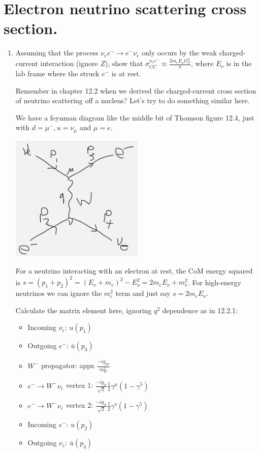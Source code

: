 \section{Electron neutrino scattering cross section.}

\begin{enumerate}[label=\textbf{\alph*}.]
  \item Assuming that the process $\nu_e e^- \to e^- \nu_e$ only occurs by the weak charged-current interaction (ignore $Z$), show that $\sigma_{CC}^{\nu_e e^-} \approx \frac{2m_e E_\nu G_F^2}{\pi}$, where $E_\nu$ is in the lab frame where the struck $e^-$ is at rest.

  Remember in chapter 12.2 when we derived the charged-current cross section of neutrino scattering off a nucleus? Let's try to do something similar here.

  We have a feynman diagram like the middle bit of Thomson figure 12.4, just with $d=\mu^-, u=\nu_\mu$ and $\mu=e$.

  \begin{center}
    \includegraphics[width=0.5\textwidth]{q4_feynman.png}
  \end{center}

  For a neutrino interacting with an electron at rest, the CoM energy squared is $s = (p_1 + p_2)^2 = (E_\nu + m_e)^2 - E_\nu^2 = 2m_e E_\nu + m_e^2$. For high-energy neutrinos we can ignore the $m_e^2$ term and just say $s = 2m_e E_\nu$.

  Calculate the matrix element here, ignoring $q^2$ dependence as in 12.2.1:

  \begin{itemize}
    \item Incoming $\nu_e$: $u(p_1)$
    \item Outgoing $e^-$: $\bar{u}(p_3)$
    \item $W^-$ propagator: appx $\frac{-ig_{\mu\nu}}{m_W^2}$
    \item $e^- \to W^- \nu_e$ vertex 1: $\frac{-ig_w}{\sqrt{2}}\frac{1}{2}\gamma^\mu(1-\gamma^5)$
    \item $e^- \to W^- \nu_e$ vertex 2: $\frac{-ig_w}{\sqrt{2}}\frac{1}{2}\gamma^\nu(1-\gamma^5)$
    \item Incoming $e^-$: $u(p_2)$
    \item Outgoing $\nu_e$: $\bar{u}(p_4)$
  \end{itemize}


\end{enumerate}
